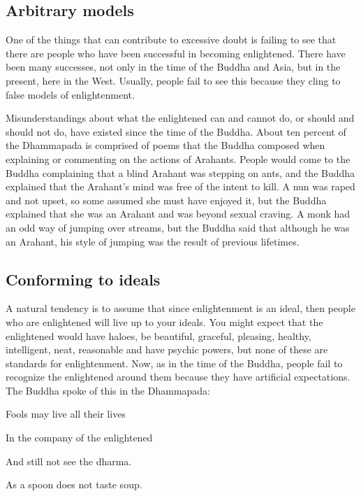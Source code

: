 \documentclass[a5paper,10pt,english]{book}
\begin{document}
\subsection{Arbitrary models}
\label{\detokenize{saints:arbitrary-models}}
\sphinxAtStartPar
One of the things that can contribute to excessive doubt is failing to
see that there are people who have been successful in becoming
enlightened. There have been many successes, not only in the time of the
Buddha and Asia, but in the present, here in the West. Usually, people
fail to see this because they cling to false models of enlightenment.

\sphinxAtStartPar
Misunderstandings about what the enlightened can and cannot do, or
should and should not do, have existed since the time of the Buddha.
About ten percent of the Dhammapada is comprised of poems that the
Buddha composed when explaining or commenting on the actions of
Arahants. People would come to the Buddha complaining that a blind
Arahant was stepping on ants, and the Buddha explained that the
Arahant’s mind was free of the intent to kill. A nun was raped and not
upset, so some assumed she must have enjoyed it, but the Buddha
explained that she was an Arahant and was beyond sexual craving. A monk
had an odd way of jumping over streams, but the Buddha said that
although he was an Arahant, his style of jumping was the result of
previous lifetimes.


\subsection{Conforming to ideals}
\label{\detokenize{saints:conforming-to-ideals}}
\sphinxAtStartPar
A natural tendency is to assume that since enlightenment is an ideal,
then people who are enlightened will live up to your ideals. You might
expect that the enlightened would have haloes, be beautiful, graceful,
pleasing, healthy, intelligent, neat, reasonable and have psychic
powers, but none of these are standards for enlightenment. Now, as in
the time of the Buddha, people fail to recognize the enlightened around
them because they have artificial expectations. The Buddha spoke of this
in the Dhammapada:

\begin{DUlineblock}{0em}
\item[] 
\item[] Fools may live all their lives
\item[] In the company of the enlightened
\item[] And still not see the dharma.
\item[] As a spoon does not taste soup.
\end{DUlineblock}
\end{document}

